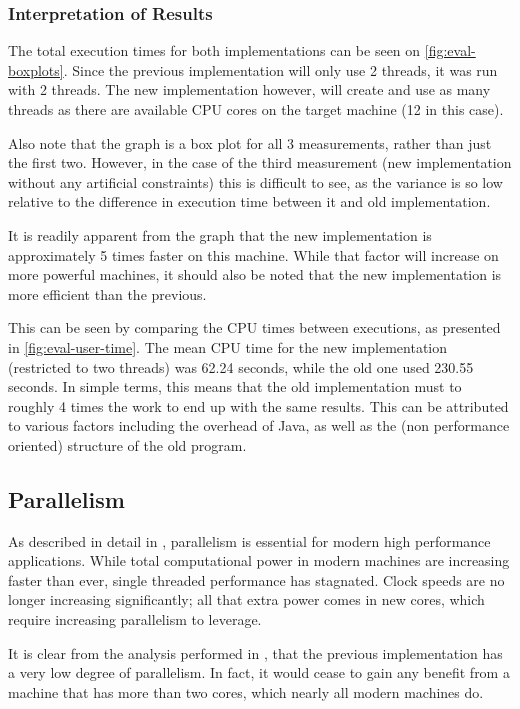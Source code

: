 \subsubsection{Interpretation of Results}
The total execution times for both implementations can be seen on \autoref{fig:eval-boxplots}. Since the previous implementation will only use 2 threads, it was run with 2 threads. 
The new implementation however, will create and use as many threads as there are available CPU cores on the target machine (12 in this case).

Also note that the graph is a box plot for all 3 measurements, rather than just the first two. However, in the case of the third measurement (new implementation without any artificial constraints) this is difficult to see, as the variance is so low relative to the difference in execution time between it and old implementation.

It is readily apparent from the graph that the new implementation is approximately 5 times faster on this machine. While that factor will increase on more powerful machines, it should also be noted that the new implementation is more efficient than the previous.

This can be seen by comparing the CPU times between executions, as presented in \autoref{fig:eval-user-time}. The mean CPU time for the new implementation (restricted to two threads) was 62.24 seconds, while the old one used 230.55 seconds. In simple terms, this means that the old implementation must to roughly 4 times the work to end up with the same results. This can be attributed to various factors including the overhead of Java, as well as the (non performance oriented) structure of the old program. 

\subsection{Parallelism}
\label{sec:eval-parallelism}
As described in detail in , parallelism is essential for modern high performance applications. While total computational power in modern machines are increasing faster than ever, single threaded performance has stagnated. Clock speeds are no longer increasing significantly; all that extra power comes in new cores, which require increasing parallelism to leverage. 

It is clear from the analysis performed in , that the previous implementation has a very low degree of parallelism. In fact, it would cease to gain any benefit from a machine that has more than two cores, which nearly all modern machines do. 

